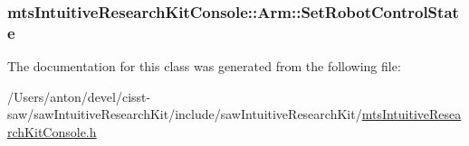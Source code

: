\subsubsection[{Set\+Robot\+Control\+State}]{ mts\+Intuitive\+Research\+Kit\+Console\+::\+Arm\+::\+Set\+Robot\+Control\+State\hspace{0.3cm}{\ttfamily [protected]}}\label{classmts_intuitive_research_kit_console_1_1_arm_a84684b49b9b5a5773a6761d08086c9bf}


The documentation for this class was generated from the following file\+:\begin{DoxyCompactItemize}
\item 
/\+Users/anton/devel/cisst-\/saw/saw\+Intuitive\+Research\+Kit/include/saw\+Intuitive\+Research\+Kit/\hyperlink{mts_intuitive_research_kit_console_8h}{mts\+Intuitive\+Research\+Kit\+Console.\+h}\end{DoxyCompactItemize}
